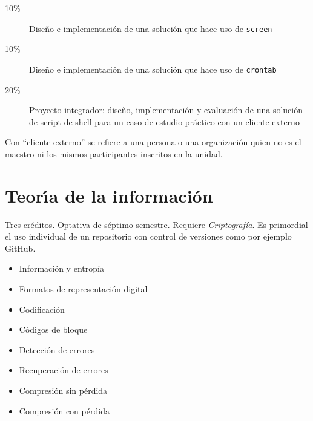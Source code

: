 \documentclass{article}
\begin{document}
\begin{multicols}{4}
\begin{description}
\item[10\%]{Dise\~{n}o e implementaci\'{o}n de una soluci\'{o}n que hace uso de \texttt{screen}}
\item[10\%]{Dise\~{n}o e implementaci\'{o}n de una soluci\'{o}n que hace uso de \texttt{crontab}}  

\item[20\%]{Proyecto integrador: dise\~{n}o, implementaci\'{o}n y evaluaci\'{o}n
  de una soluci\'{o}n de script de shell para un caso de estudio pr\'{a}ctico
  con un cliente externo}
\end{description}  

Con ``cliente externo'' se refiere a una persona o una organizaci\'{o}n
quien no es el maestro ni los mismos participantes inscritos en la
unidad.

\newpage

\hypertarget{tdi}{\section*{Teor\'{\i}a de la informaci\'{o}n}}

Tres cr\'{e}ditos. Optativa de s\'{e}ptimo semestre. Requiere
\hyperlink{cr}{\em Criptograf\'{i}a}.  Es primordial el uso individual
de un repositorio con control de versiones como por ejemplo GitHub.

\begin{itemize}
\item{Informaci\'{o}n y entrop\'{i}a}
\item{Formatos de representaci\'{o}n digital}
\item{Codificaci\'{o}n}
\item{C\'{o}digos de bloque}
\item{Detecci\'{o}n de errores}
\item{Recuperaci\'{o}n de errores}
\item{Compresi\'{o}n sin p\'{e}rdida}
\item{Compresi\'{o}n con p\'{e}rdida}
\end{itemize}


\end{multicols}
\end{document}
